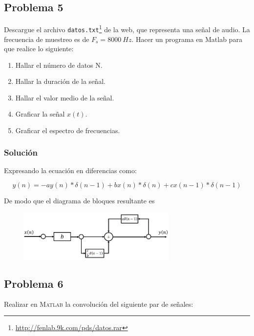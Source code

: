 \documentclass[a4paper,12pt,final]{article}
\begin{document}
  \newpage
  \subsection*{Problema 5}
    \noindent Descargue el archivo \texttt{datos.txt}\footnote{\url{http://fenlab.9k.com/pds/datos.rar}} de la web, que representa una señal de audio.
      La frecuencia de muestreo es de $F_s = 8000\ Hz$. Hacer un programa en Matlab para que realice
      lo siguiente:

      \begin{enumerate}[label=\alph*)]
        \item Hallar el número de datos N.
        \item Hallar la duración de la señal.
        \item Hallar el valor medio de la señal.
        \item Graficar la señal $x\left(t\right)$.
        \item Graficar el espectro de frecuencias.
      \end{enumerate}

    \subsubsection*{Solución}
      \noindent Expresando la ecuación en diferencias como:

      $$y\left(n\right) = -a y\left(n\right) * \delta\left(n-1\right) + b x\left(n\right) * \delta\left(n\right) + c x\left(n-1\right) * \delta\left(n-1\right)$$

      \noindent De modo que el diagrama de bloques resultante es

      \begin{figure}[H]
        \begin{center}
          \includegraphics[width=0.7\textwidth]{./laboratorio_3/problema05_diagram.png}
        \end{center}
      \end{figure}

  \newpage
  \subsection*{Problema 6}
    \noindent Realizar en \textsc{Matlab} la convolución del siguiente par de
    señales:
\end{document}
